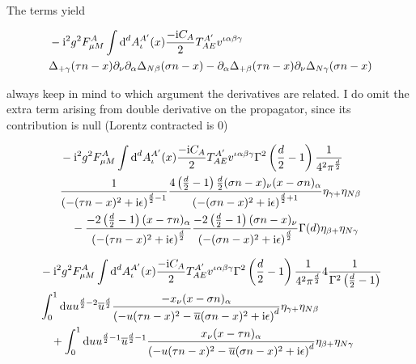The terms yield

\begin{align}
	&-\text{i}^2 g^2 F_{\mu M}^{A} \int \text{d} ^d  A_\iota^{A'}(x)\frac{-\text{i} C_A}{2} T^{A'}_{AE}v^{\iota \alpha\beta\gamma}
	\\
	&\Delta_{+\gamma}(\tau n- x) \partial_{\nu} \partial_{\alpha}\Delta_{N\beta}(\sigma n -x) - \partial_{\alpha}\Delta_{+ \beta}(\tau n - x)\partial_{\nu}\Delta_{N \gamma}(\sigma n-x)
\end{align}

always keep in mind to which argument the derivatives are related. I do omit the extra term arising from double derivative on the propagator, since its contribution is null (Lorentz contracted is 0)

\begin{align}
	&-\text{i}^2 g^2 F_{\mu M}^{A} \int \text{d} ^d  A_\iota^{A'}(x)\frac{-\text{i} C_A}{2} T^{A'}_{AE}v^{\iota \alpha\beta\gamma}\Gamma^2\left(\frac{d}{2}-1\right)\frac{1}{4^2\pi^\frac{d}{2}}
	\\
	&\frac{1}{\left(-(\tau n -x)^2+\text{i} \epsilon\right)^{\frac{d}{2}-1}}\frac{4\left(\frac{d}{2}-1\right)\frac{d}{2}(\sigma n -x)_\nu(x-\sigma n)_\alpha}{\left(-(\sigma n -x)^2+\text{i} \epsilon\right)^{\frac{d}{2}+1}}\eta_{\gamma +}\eta_{N \beta}
	\\&~~~
	-\frac{-2\left(\frac{d}{2}-1\right)(x -\tau n)_\alpha}{\left(-(\tau n -x)^2+\text{i} \epsilon\right)^{\frac{d}{2}}}\frac{-2\left(\frac{d}{2}-1\right)( \sigma n -x )_\nu}{\left(-(\sigma n -x)^2+\text{i} \epsilon\right)^{\frac{d}{2}}}\Gamma(d) \eta_{\beta +}\eta_{N \gamma}
\end{align}

\begin{align}
	&-\text{i}^2 g^2 F_{\mu M}^{A} \int \text{d} ^d  A_\iota^{A'}(x)\frac{-\text{i} C_A}{2} T^{A'}_{AE}v^{\iota \alpha\beta\gamma}\Gamma^2\left(\frac{d}{2}-1\right)\frac{1}{4^2\pi^\frac{d}{2}}4 \frac{1}{\Gamma^2\left(\frac{d}{2}-1\right)}
	\\
	&\int_0^1 \text{d} u u^{\frac{d}{2}-2}\overline u^{\frac{d}{2}}\frac{-x_\nu(x-\sigma n)_\alpha}{\left(-u(\tau n -x)^2-\overline u(\sigma n -x)^2+\text{i} \epsilon\right)^{d}}\eta_{\gamma +}\eta_{N \beta}
	\\&~~~
	+\int_0^1 \text{d} u u^{\frac{d}{2}-1}\overline u^{\frac{d}{2}-1}\frac{x_\nu(x- \tau  n )_\alpha}{\left(-u(\tau n -x)^2-\overline u(\sigma n -x)^2+\text{i} \epsilon\right)^{d}}\eta_{\beta +}\eta_{N \gamma}
\end{align}

